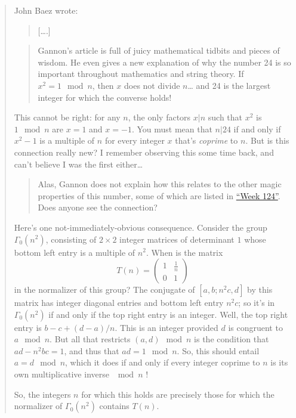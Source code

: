\documentclass{article}
\begin{document}
\begin{quote}
John Baez wrote:

\begin{quote}
{[}\ldots.{]}
\end{quote}

\begin{quote}
Gannon's article is full of juicy mathematical tidbits and pieces of
wisdom. He even gives a new explanation of why the number 24 is so
important throughout mathematics and string theory. If
\(x^2 = 1 \mod n\), then \(x\) does not divide \(n\)\ldots{} and 24 is
the largest integer for which the converse holds!
\end{quote}

This cannot be right: for any \(n\), the only factors \(x|n\) such that
\(x^2\) is \(1 \mod n\) are \(x=1\) and \(x=-1\). You must mean that
\(n|24\) if and only if \(x^2-1\) is a multiple of \(n\) for every
integer \(x\) that's \emph{coprime} to \(n\). But is this connection
really new? I remember observing this some time back, and can't believe
I was the first either\ldots{}

\begin{quote}
Alas, Gannon does not explain how this relates to the other magic
properties of this number, some of which are listed in
\protect\hyperlink{week124}{``Week 124''}. Does anyone see the
connection?
\end{quote}

Here's one not-immediately-obvious consequence. Consider the group
\(\Gamma_0(n^2)\), consisting of \(2\times2\) integer matrices of
determinant \(1\) whose bottom left entry is a multiple of \(n^2\). When
is the matrix
\[T(n) = \left(\begin{array}{cc}1&\frac1n\\0&1\end{array}\right)\] in
the normalizer of this group? The conjugate of \([a, b; n^2 c, d]\) by
this matrix has integer diagonal entries and bottom left entry \(n^2c\);
so it's in \(\Gamma_0(n^2)\) if and only if the top right entry is an
integer. Well, the top right entry is \(b-c + (d-a)/n\). This is an
integer provided \(d\) is congruent to \(a \mod n\). But all that
restricts \((a,d)\mod n\) is the condition that \(ad-n^2bc=1\), and thus
that \(ad=1\mod n\). So, this should entail \(a=d\mod n\), which it does
if and only if every integer coprime to \(n\) is its own multiplicative
inverse \(\mod n\) !

So, the integers \(n\) for which this holds are precisely those for
which the normalizer of \(\Gamma_0(n^2)\) contains \(T(n)\).


\end{quote}
\end{document}
